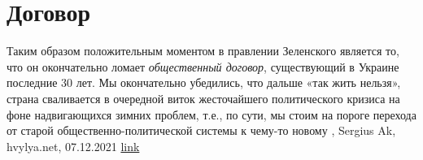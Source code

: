  
 
 
 
 
\chapter{Договор}

Таким образом положительным моментом в правлении Зеленского является то, что он
окончательно ломает \emph{общественный договор}, существующий в Украине последние 30
лет. Мы окончательно убедились, что дальше «так жить нельзя», страна
сваливается в очередной виток жесточайшего политического кризиса на фоне
надвигающихся зимних проблем, т.е., по сути, мы стоим на пороге перехода от
старой общественно-политической системы к чему-то новому
, 
Sergius Ak, hvylya.net, 07.12.2021
\href{https://hvylya.net/analytics/243091-ukraina-posle-zelenskogo}{link}

